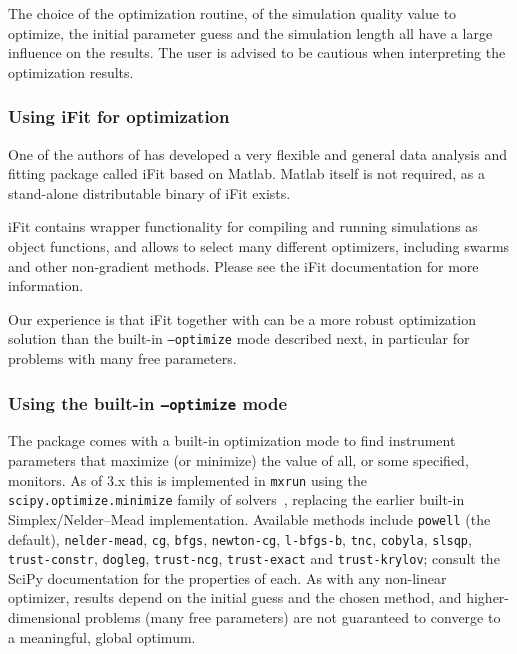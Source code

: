 The choice of the optimization routine, of the simulation quality value to
optimize, the initial parameter guess and the simulation length all have a large
influence on the results.  The user is advised to be cautious when interpreting
the optimization results.

\subsubsection{Using iFit for optimization}

One of the authors of \MCX has developed a very flexible and general data
analysis and fitting package called iFit \cite{iFit,iFit_web} based on
Matlab. Matlab itself is not required, as a stand-alone distributable binary of
iFit exists.

iFit contains wrapper functionality for compiling and running \MCX simulations
as object functions, and allows to select many different optimizers, including
swarms and other non-gradient methods. Please see the iFit documentation for
more information.

Our experience is that iFit together with \MCX can be a more robust optimization
solution than the \MCX built-in \texttt{--optimize} mode described next, in
particular for problems with many free parameters.

\subsubsection{Using the built-in \texttt{--optimize} mode}
\label{s:optimize-builtin}

The \MCX package comes with a built-in optimization mode to find
instrument parameters that maximize (or minimize) the value of all, or
some specified, monitors. As of \MCX 3.x this is implemented in
\texttt{mxrun} using the \texttt{scipy.optimize.minimize} family of
solvers~\cite{scipy_webpage}, replacing the earlier built-in Simplex/Nelder--Mead
implementation. Available methods include \texttt{powell} (the default),
\texttt{nelder-mead}, \texttt{cg}, \texttt{bfgs}, \texttt{newton-cg},
\texttt{l-bfgs-b}, \texttt{tnc}, \texttt{cobyla}, \texttt{slsqp},
\texttt{trust-constr}, \texttt{dogleg}, \texttt{trust-ncg},
\texttt{trust-exact} and \texttt{trust-krylov}; consult the SciPy
documentation for the properties of each. As with any non-linear
optimizer, results depend on the initial guess and the chosen method, and
higher-dimensional problems (many free parameters) are not guaranteed to
converge to a meaningful, global optimum.

